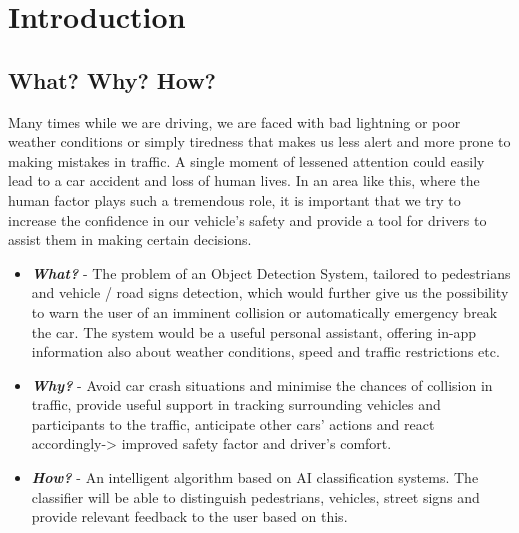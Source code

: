 \documentclass[runningheads,a4paper,11pt]{report}
\begin{document}
\tableofcontents

\newpage

\listoftables
\listoffigures

\newpage




\newpage



 


\chapter{Introduction}
\label{chapter:introduction}

\section{What? Why? How?}
\label{section:what}

Many times while we are driving, we are faced with bad lightning or poor weather conditions or simply tiredness that makes us less alert and more prone to making mistakes in traffic. A single moment of lessened attention could easily lead to a car accident and loss of human lives. In an area like this, where the human factor plays such a tremendous role, it is important that we try to increase the confidence in our vehicle's safety and provide a tool for drivers to assist them in making certain decisions.

\begin{itemize}
	\item \textbf{\emph{What?}} - The problem of an Object Detection System, tailored to pedestrians and vehicle / road signs detection, which would further give us the possibility to warn the user of an imminent collision or automatically emergency break the car. The system would be a useful personal assistant, offering in-app information also about weather conditions, speed and traffic restrictions etc.
	\item \textbf{\emph{Why?}} - Avoid car crash situations and minimise the chances of collision in traffic, provide useful support in tracking surrounding vehicles and participants to the traffic, anticipate other cars' actions and react accordingly-> improved safety factor and driver's comfort.
	\item \textbf{\emph{How?}} - An intelligent algorithm based on AI classification systems. The classifier will be able to distinguish pedestrians, vehicles, street signs and provide relevant feedback to the user based on this.
\end{itemize}
\end{document}

